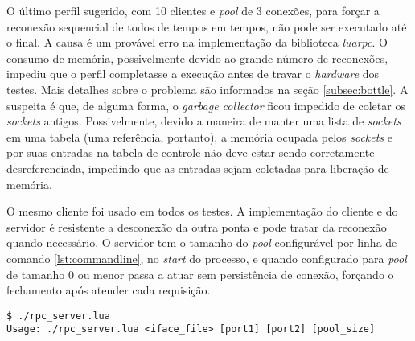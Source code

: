 \documentclass[11pt]{article}
\begin{document}
O último perfil sugerido, com 10 clientes e \textit{pool} de 3 conexões, para
forçar a reconexão sequencial de todos de tempos em tempos, não pode ser
executado até o final. A causa é um provável erro na implementação da biblioteca
\textit{luarpc}. O consumo de memória, possivelmente devido ao grande número de
reconexões, impediu que o perfil completasse a execução antes de travar o
\textit{hardware} dos testes. Mais detalhes sobre o problema são informados na
seção \ref{subsec:bottle}. A suspeita é que, de alguma forma, o \textit{garbage
collector} ficou impedido de coletar os \textit{sockets} antigos. Possivelmente,
devido a maneira de manter uma lista de \textit{sockets} em uma tabela (uma
referência, portanto), a memória ocupada pelos \textit{sockets} e por suas
entradas na tabela de controle não deve estar sendo corretamente
desreferenciada, impedindo que as entradas sejam coletadas para liberação de
memória.

O mesmo cliente foi usado em todos os testes. A implementação do cliente e do
servidor é resistente a desconexão da outra ponta e pode tratar da reconexão
quando necessário. O servidor tem o tamanho do \textit{pool} configurável por
linha de comando \ref{lst:commandline}, no \textit{start} do processo, e quando
configurado para \textit{pool} de tamanho 0 ou menor passa a atuar sem
persistência de conexão, forçando o fechamento após atender cada requisição.

\begin{lstlisting}[caption={Linha de comando},label={lst:commandline}]
$ ./rpc_server.lua
Usage: ./rpc_server.lua <iface_file> [port1] [port2] [pool_size]
\end{lstlisting}
\end{document}
